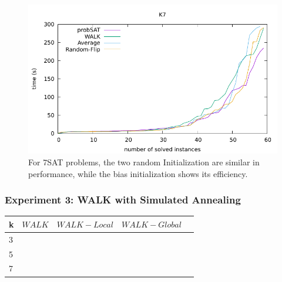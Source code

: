 \documentclass[12pt,a4paper,twoside]{scrartcl}
\numberwithin{equation}{section}
\begin{document}
  \begin{figure}[H]
\begin{center}
  \includegraphics[scale = 1]{DATA/K7/e2.pdf}
  \end{center}
  \caption{For 7SAT problems, the two random Initialization are similar in performance, while the bias initialization shows its efficiency.}
  \label{Experiment 2 k7 cactus plot}
  \end{figure}

\subsubsection{Experiment 3: WALK with Simulated Annealing} 
\begin{table}[h!]
\begin{center}
    \begin{tabular}{|l|l|l|l|p{3cm}|}
\hline 

    k &$WALK$&$WALK-Local$&$WALK-Global$ \\ \hline      
    3 &  \\ \hline
    5& \\ \hline
    7& \\ \hline












	
\end{tabular}
\end{center}
\end{table} 
\end{document}
